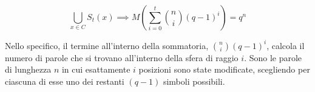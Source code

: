 \[\bigcup_{x \in C} S_t(x) \implies  M \left( \sum_{i=0}^t \binom{n}{i}(q-1)^i \right)= q^n\]

Nello specifico, il termine all'interno della sommatoria, $\binom{n}{i}(q-1)^{i}$, calcola il numero di parole che si trovano all'interno della sfera di raggio $i$. Sono le parole di lunghezza $n$ in cui esattamente $i$ posizioni sono state modificate, scegliendo per ciascuna di esse uno dei restanti $(q-1)$ simboli possibili.

